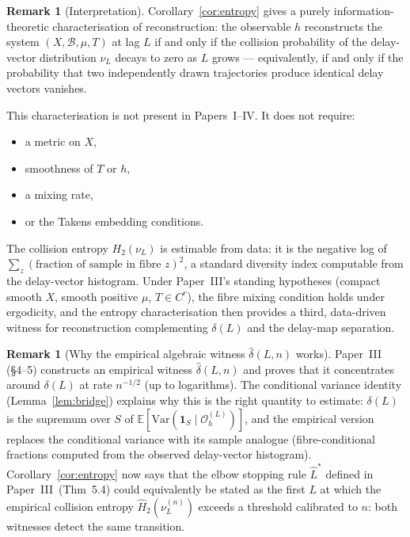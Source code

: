 \documentclass[11pt]{article}
\theoremstyle{definition}
\newtheorem{remark}[theorem]{Remark}
\newcommand{\Bcal}{\mathcal{B}}
\newcommand{\OL}{\mathcal{O}_h^{(L)}}
\newcommand{\dL}{\delta(L)}
\begin{document}
\begin{remark}[Interpretation]
Corollary~\ref{cor:entropy} gives a purely information-theoretic
characterisation of reconstruction: the observable $h$ reconstructs the system
$(X, \Bcal, \mu, T)$ at lag $L$ if and only if the collision probability of the
delay-vector distribution $\nu_L$ decays to zero as $L$ grows --- equivalently,
if and only if the probability that two independently drawn trajectories produce
identical delay vectors vanishes.

This characterisation is not present in Papers~I--IV.
It does not require:
\begin{itemize}
  \item a metric on $X$,
  \item smoothness of $T$ or $h$,
  \item a mixing rate,
  \item or the Takens embedding conditions.
\end{itemize}
The collision entropy $H_2(\nu_L)$ is estimable from data: it is the
negative log of $\sum_z (\text{fraction of sample in fibre } z)^2$,
a standard diversity index computable from the delay-vector histogram.
Under Paper~III's standing hypotheses (compact smooth $X$, smooth positive $\mu$,
$T \in C^r$), the fibre mixing condition holds under ergodicity, and the
entropy characterisation then provides a third, data-driven witness for
reconstruction complementing $\delta(L)$ and the delay-map separation.
\end{remark}

\begin{remark}[Why the empirical algebraic witness $\hat\delta(L,n)$ works]
\label{rem:empirical-link}
Paper~III (\S4--5) constructs an empirical witness $\hat\delta(L,n)$ and proves
that it concentrates around $\dL$ at rate $n^{-1/2}$ (up to logarithms).
The conditional variance identity (Lemma~\ref{lem:bridge}) explains why this
is the right quantity to estimate: $\dL$ is the supremum over $S$ of
$\mathbb{E}[\mathrm{Var}(\mathbf{1}_S \mid \OL)]$, and the empirical version
replaces the conditional variance with its sample analogue (fibre-conditional
fractions computed from the observed delay-vector histogram).
Corollary~\ref{cor:entropy} now says that the elbow stopping rule $\hat L^*$
defined in Paper~III~(Thm~5.4) could equivalently be stated as the first $L$
at which the empirical collision entropy $\hat H_2(\nu_L^{(n)})$ exceeds a
threshold calibrated to $n$: both witnesses detect the same transition.
\end{remark}
\end{document}
